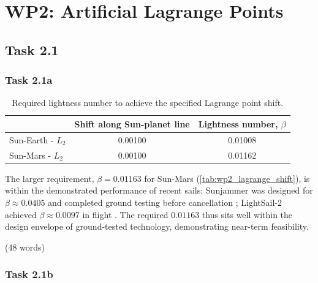 \chapter{WP2: Artificial Lagrange Points}
\label{chapter:wp2}

\section{Task 2.1}

\subsection{Task 2.1a}

\begin{table}[H]
  \centering
  \caption{Required lightness number to achieve the specified Lagrange point shift.}
  \label{tab:wp2_lagrange_shift}
  \begin{tabular}{@{} l S[table-format=1.5] S[table-format=1.5] @{}}
    \toprule
     & {Shift along Sun-planet line} & {Lightness number, $\beta$} \\
    \midrule
    Sun-Earth - $L_2$ & 0.00100 & 0.01008 \\
    Sun-Mars  - $L_2$ & 0.00100 & 0.01162 \\
    \bottomrule
  \end{tabular}
\end{table}

The larger requirement, $\beta = 0.01163$ for Sun-Mars (\autoref{tab:wp2_lagrange_shift}), is within the demonstrated performance of recent sails: 
Sunjammer was designed for $\beta \approx 0.0405$ and completed ground testing before cancellation \parencite{heiligers2014sunjammer}; LightSail-2 achieved $\beta \approx 0.0097$ in flight \parencite{ancona2024recent}.
The required $0.01163$ thus sits well within the design envelope of ground-tested technology, demonstrating near-term feasibility.


(48 words)

\subsection{Task 2.1b}

